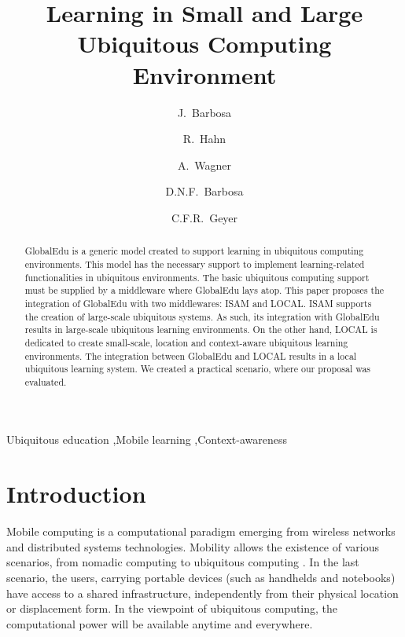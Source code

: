 \documentclass[5p,authoryear]{elsarticle}
\begin{document}
%
%
\title{Learning in Small and Large Ubiquitous Computing Environment}

\author[unisinos]{J.~Barbosa} 

\author[unisinos]{R.~Hahn} 

\author[unisinos]{A.~Wagner} 

\author[unilasalle]{D.N.F.~Barbosa} 

\author[ufrgs]{C.F.R.~Geyer} 

\address[unisinos]{PIPCA/Unisinos, S\~{a}o Leopoldo, RS, Brazil}
\address[unilasalle]{UniLasalle, Canoas, RS, Brazil} 
\address[ufrgs]{UFRGS, Porto Alegre, RS, Brazil}

%
%
\begin{abstract}

GlobalEdu is a generic model created to support learning in ubiquitous
computing environments. This model has the necessary support to implement
learning-related functionalities in ubiquitous environments. The basic
ubiquitous computing support must be supplied by a middleware where GlobalEdu
lays atop. This paper proposes the integration of GlobalEdu with two
middlewares: ISAM and LOCAL. ISAM supports the creation of large-scale
ubiquitous systems. As such, its integration with GlobalEdu results in
large-scale ubiquitous learning environments. On the other hand, LOCAL is
dedicated to create small-scale, location and context-aware ubiquitous learning
environments. The integration between GlobalEdu and LOCAL results in a local
ubiquitous learning system. We created a practical scenario, where our proposal
was evaluated.

\end{abstract}

\begin{keyword}
Ubiquitous education \sep Mobile learning \sep Context-awareness
\end{keyword}

\maketitle

%
%
\section{Introduction}

Mobile computing is a computational paradigm emerging from wireless networks
and distributed systems technologies. Mobility allows the existence of various
scenarios, from nomadic computing to ubiquitous computing
\citep{weiser91,satyanarayanan01}. In the last scenario, the users, carrying
portable devices (such as handhelds and notebooks) have access to a shared
infrastructure, independently from their physical location or displacement
form. In the viewpoint of ubiquitous computing, the computational power will be
available anytime and everywhere. 
\end{document}
